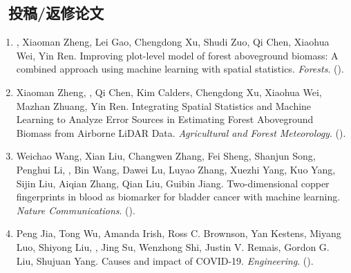 \subsection*{\texorpdfstring{\faBook\ 投稿/返修论文}{投稿/返修论文}}
\begin{enumerate}
\item
    \Shaoqing\CF, Xiaoman Zheng, Lei Gao, Chengdong Xu, Shudi Zuo, Qi Chen, Xiaohua Wei, Yin Ren.
    Improving plot-level model of forest aboveground biomass: A combined approach using machine learning with spatial statistics.
    \textit{Forests}. 
    (\Revision).
\item
    Xiaoman Zheng, \Shaoqing, Qi Chen, Kim Calders, Chengdong Xu, Xiaohua Wei, Mazhan Zhuang, Yin Ren.
    Integrating Spatial Statistics and Machine Learning to Analyze Error Sources in Estimating Forest Aboveground Biomass from Airborne LiDAR Data.
    \textit{Agricultural and Forest Meteorology}. 
    (\Revision).
\item
    Weichao Wang, Xian Liu, Changwen Zhang, Fei Sheng, Shanjun Song, Penghui Li, \Shaoqing, Bin Wang, Dawei Lu, Luyao Zhang, Xuezhi Yang, Kuo Yang, Sijin Liu, Aiqian Zhang, Qian Liu, Guibin Jiang.
    Two-dimensional copper fingerprints in blood as biomarker for bladder cancer with machine learning.
    \textit{Nature Communications}. 
    (\Submitted).
\item
    Peng Jia, Tong Wu, Amanda Irish, Ross C. Brownson, Yan Kestens, Miyang Luo, Shiyong Liu, \Shaoqing, Jing Su, Wenzhong Shi, Justin V. Remais, Gordon G. Liu, Shujuan Yang.
    Causes and impact of COVID-19.
    \textit{Engineering}. 
    (\Revision).
\end{enumerate}